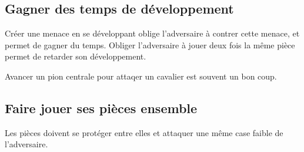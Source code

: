 \subsection{Gagner des  temps de développement}
Créer une menace en se développant oblige l'adversaire à contrer cette menace, et permet de gagner du temps. Obliger l'adversaire à jouer deux fois la même pièce permet de retarder son développement.

Avancer un pion centrale pour attaqer un cavalier est souvent un bon coup.

\subsection{Faire jouer ses pièces ensemble}

Les pièces doivent se protéger entre elles et attaquer une même case faible de l'adversaire.



